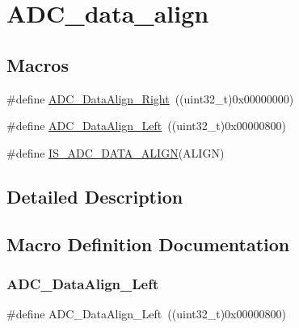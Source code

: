 \hypertarget{group___a_d_c__data__align}{}\section{A\+D\+C\+\_\+data\+\_\+align}
\label{group___a_d_c__data__align}
\subsection*{Macros}
\begin{DoxyCompactItemize}
\item 
\#define \mbox{\hyperlink{group___a_d_c__data__align_ga80b5d2f2b6b058bc498f58e0a92ad035}{A\+D\+C\+\_\+\+Data\+Align\+\_\+\+Right}}~((uint32\+\_\+t)0x00000000)
\item 
\#define \mbox{\hyperlink{group___a_d_c__data__align_ga87c2b7021bc288174d5d6175dc267251}{A\+D\+C\+\_\+\+Data\+Align\+\_\+\+Left}}~((uint32\+\_\+t)0x00000800)
\item 
\#define \mbox{\hyperlink{group___a_d_c__data__align_ga2903b620e3c61dc47ed8c0fbf4197801}{I\+S\+\_\+\+A\+D\+C\+\_\+\+D\+A\+T\+A\+\_\+\+A\+L\+I\+GN}}(A\+L\+I\+GN)
\end{DoxyCompactItemize}


\subsection{Detailed Description}


\subsection{Macro Definition Documentation}
\mbox{\label{group___a_d_c__data__align_ga87c2b7021bc288174d5d6175dc267251}} 
\subsubsection{\texorpdfstring{ADC\_DataAlign\_Left}{ADC\_DataAlign\_Left}}
{\footnotesize\ttfamily \#define A\+D\+C\+\_\+\+Data\+Align\+\_\+\+Left~((uint32\+\_\+t)0x00000800)}

\mbox{\label{group___a_d_c__data__align_ga80b5d2f2b6b058bc498f58e0a92ad035}} 
